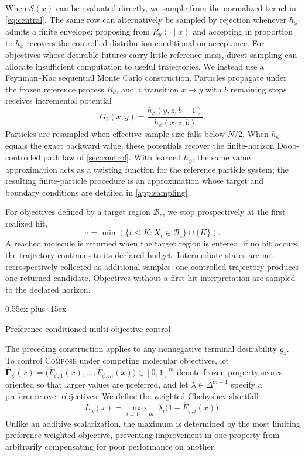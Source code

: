 \documentclass{article}
\makeatletter
\theoremstyle{definition}
\theoremstyle{remark}
\newcommand{\method}{\textsc{Compose}\xspace}
\def\subsection{\@startsection{subsection}{2}{\z@}{-1.2ex plus -0.4ex minus -.2ex}%
  {0.55ex plus .15ex}{\normalsize\sc\raggedright}}
\newcommand{\Sset}{\mathcal{S}}
\newcommand{\Bset}{\mathcal{B}}
\makeatother
\begin{document}
When $\Sset(x)$ can be evaluated directly, we sample from the normalized kernel in \cref{eq:central}. The same row can alternatively be sampled by rejection whenever $h_\phi$ admits a finite envelope: proposing from $R_\theta(\cdot\mid x)$ and accepting in proportion to $h_\phi$ recovers the controlled distribution conditional on acceptance. For objectives whose desirable futures carry little reference mass, direct sampling can allocate insufficient computation to useful trajectories. We instead use a Feynman--Kac sequential Monte Carlo construction. Particles propagate under the frozen reference process $R_\theta$, and a transition $x\to y$ with $b$ remaining steps receives incremental potential
\begin{equation}
G_b(x,y)=\frac{h_\phi(y,z,b-1)}{h_\phi(x,z,b)}.
\label{eq:fk}
\end{equation}
Particles are resampled when effective sample size falls below $N/2$. When $h_\phi$ equals the exact backward value, these potentials recover the finite-horizon Doob-controlled path law of \cref{sec:control}. With learned $h_\phi$, the same value approximation acts as a twisting function for the reference particle system; the resulting finite-particle procedure is an approximation whose target and boundary conditions are detailed in \cref{app:sampling}.

For objectives defined by a target region $\Bset_z$, we stop prospectively at the first realized hit,
\begin{equation}
\tau=\min\!\left(\{t\le K:X_t\in\Bset_z\}\cup\{K\}\right).
\label{eq:stop}
\end{equation}
A reached molecule is returned when the target region is entered; if no hit occurs, the trajectory continues to its declared budget. Intermediate states are not retrospectively collected as additional samples: one controlled trajectory produces one returned candidate. Objectives without a first-hit interpretation are sampled to the declared horizon.

\subsection{Preference-conditioned multi-objective control}
\label{sec:preferences}

The preceding construction applies to any nonnegative terminal desirability $g_z$. To control \method{} under competing molecular objectives, let $\widehat{\mathbf F}_\psi(x)=\bigl(\widehat F_{\psi,1}(x),\ldots,\widehat F_{\psi,m}(x)\bigr)\in[0,1]^m$ denote frozen property scores oriented so that larger values are preferred, and let $\lambda\in\Delta^{m-1}$ specify a preference over objectives. We define the weighted Chebyshev shortfall
\begin{equation}
L_\lambda(x)=\max_{i=1,\ldots,m}\ \lambda_i\bigl(1-\widehat F_{\psi,i}(x)\bigr).
\label{eq:cheby}
\end{equation}
Unlike an additive scalarization, the maximum is determined by the most limiting preference-weighted objective, preventing improvement in one property from arbitrarily compensating for poor performance on another.
\end{document}
